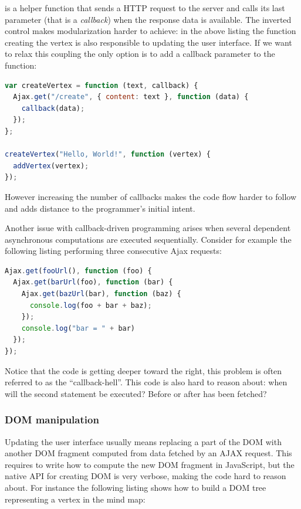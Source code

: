 \documentclass[american,english,runningheads]{llncs}
\begin{document}
 is a helper function that sends a HTTP request to the server and calls its last parameter (that is a \emph{callback}) when the response data is available. The inverted control makes modularization harder to achieve: in the above listing the function creating the vertex is also responsible to updating the user interface. If we want to relax this coupling the only option is to add a callback parameter to the  function:

\begin{lstlisting}[language=JavaScript,label=async-js]
var createVertex = function (text, callback) {
  Ajax.get("/create", { content: text }, function (data) {
    callback(data);
  });
};

createVertex("Hello, World!", function (vertex) {
  addVertex(vertex);
});
\end{lstlisting}

However increasing the number of callbacks makes the code flow harder to follow and adds distance to the programmer's initial intent.

Another issue with callback-driven programming arises when several dependent asynchronous computations are executed sequentially. Consider for example the following listing performing three consecutive Ajax requests:

\begin{lstlisting}[language=JavaScript]
Ajax.get(fooUrl(), function (foo) {
  Ajax.get(barUrl(foo), function (bar) {
    Ajax.get(bazUrl(bar), function (baz) {
      console.log(foo + bar + baz);
    });
    console.log("bar = " + bar)
  });
});
\end{lstlisting}

Notice that the code is getting deeper toward the right, this problem is often referred to as the “callback-hell”. This code is also hard to reason about: when will the second  statement be executed? Before or after  has been fetched?

\subsubsection{DOM manipulation}
\label{forest}

Updating the user interface usually means replacing a part of the DOM with another DOM fragment computed from data fetched by an AJAX request. This requires to write how to compute the new DOM fragment in JavaScript, but the native API for creating DOM is very verbose, making the code hard to reason about. For instance the following listing shows how to build a DOM tree representing a vertex in the mind map:
\end{document}
